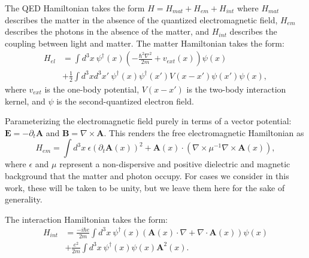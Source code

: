 \documentclass[aps,prl,twocolumn,
	groupedaddress,superscriptaddress,
	amsfonts,amssymb,amsmath,floatfix,
	citeautoscript]{revtex4-1}
\newcommand{\Jadd}[1]{\textcolor{blue}{#1}}
\begin{document}
The QED Hamiltonian takes the form $H = H_{mat}+H_{em}+H_{int}$ where $H_{mat}$ describes the matter in the absence of the quantized electromagnetic field, $H_{em}$ describes the photons in the absence of the matter, and $H_{int}$ describes the coupling between light and matter. The matter Hamiltonian takes the form:
\begin{align}
H_{el} &= \int d^3x ~\psi^{\dagger}(x)\left(-\frac{\hbar^2\nabla^2}{2m} + v_{ext}(x) \right)\psi(x) \nonumber \\ &+ \frac{1}{2}\int d^3x d^3x'~ \psi^{\dagger}(x)\psi^{\dagger}(x')V(x-x')\psi(x')\psi(x),
\end{align}
where $v_{ext}$ is the one-body potential, $V(x-x')$ is the two-body interaction kernel, and $\psi$ is the second-quantized electron field. %

Parameterizing the electromagnetic field purely in terms of a vector potential: $\mathbf{E} = -\partial_t\mathbf{A}$ and $\mathbf{B} = \nabla\times\mathbf{A}$. This renders the free electromagnetic Hamiltonian as
\begin{equation}
H_{em} = \int d^3x~ \epsilon (\partial_t \mathbf{A}(x))^2 + \mathbf{A}(x)\cdot(\nabla\times\mu^{-1}\nabla\times\mathbf{A}(x)),
\end{equation}
where $\epsilon$ and $\mu$ represent a non-dispersive and positive dielectric and magnetic background that the matter and photon occupy. For cases we consider in this work, these will be taken to be unity, but we leave them here for the sake of generality.

The interaction Hamiltonian takes the form:
\begin{align}
H_{int} &= \frac{-i\hbar e}{2m}\int d^3x ~\psi^{\dagger}(x)(\mathbf{A}(x)\cdot\nabla +  \nabla \cdot \mathbf{A}(x))\psi(x) \nonumber \\ &+ \frac{e^2}{2m}\int d^3x ~\psi^{\dagger}(x)\psi(x)\mathbf{A}^2(x).
\end{align}
\end{document}
